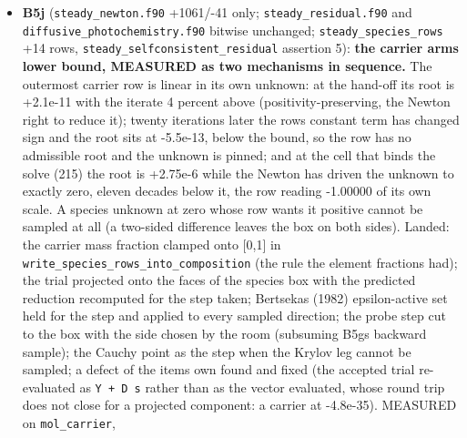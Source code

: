 \documentclass[english,a4paper]{my_memo}
\begin{document}
\begin{itemize}
  5e-3); the validity paragraph\textquotesingle s "one of three" made four. The \texttt{\_adv}
  validity conditions live in ONE place (manual section 4,
  \texttt{\textbackslash{}label\{sec:advvalidity\}}), the HOWTO points there; the HOWTO names
  \texttt{exhale\_io.py} as the loader every new script should use (four \texttt{\#\ columns} parsers exist). Advisor: the same three stale statements in
  \texttt{parameters.f90}\textquotesingle s comments corrected (default 1e-5; the row scaling; the
  retired base valve), and the four schema rows whose code spans carried a
  \texttt{\textbar{}} (a strict renderer split them) rewritten; table widths verified.
\item
  \textbf{B5j} (\texttt{steady\_newton.f90} +1061/-41 only; \texttt{steady\_residual.f90} and
  \texttt{diffusive\_photochemistry.f90} bitwise unchanged; \texttt{steady\_species\_rows}
  +14 rows, \texttt{steady\_selfconsistent\_residual} assertion 5): \textbf{the carrier
  arm\textquotesingle s lower bound, MEASURED as two mechanisms in sequence.} The
  outermost carrier row is linear in its own unknown: at the hand-off its
  root is +2.1e-11 with the iterate 4 percent above (positivity-preserving,
  the Newton right to reduce it); twenty iterations later the row\textquotesingle s
  constant term has changed sign and the root sits at -5.5e-13, below the
  bound, so the row has no admissible root and the unknown is pinned; and
  at the cell that binds the solve (215) the root is +2.75e-6 while the
  Newton has driven the unknown to exactly zero, eleven decades below it,
  the row reading -1.00000 of its own scale. A species unknown at zero
  whose row wants it positive cannot be sampled at all (a two-sided
  difference leaves the box on both sides). Landed: the carrier mass
  fraction clamped onto {[}0,1{]} in \texttt{write\_species\_rows\_into\_composition} (the
  rule the element fractions had); the trial projected onto the faces of
  the species box with the predicted reduction recomputed for the step
  taken; Bertsekas (1982) epsilon-active set held for the step and applied
  to every sampled direction; the probe step cut to the box with the side
  chosen by the room (subsuming B5g\textquotesingle s backward sample); the Cauchy point as
  the step when the Krylov leg cannot be sampled; a defect of the item\textquotesingle s
  own found and fixed (the accepted trial re-evaluated as \texttt{Y\ +\ D\ s} rather
  than as the vector evaluated, whose round trip does not close for a
  projected component: a carrier at -4.8e-35). MEASURED on \texttt{mol\_carrier},

\end{itemize}
\end{document}
